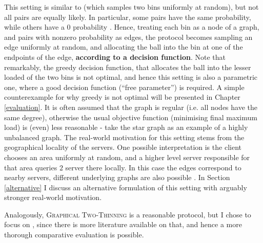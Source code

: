 This setting is similar to \TwoChoice (which samples two bins uniformly at random), but not all pairs are equally likely. In particular, some pairs have the same probability, while others have a $0$ probability . Hence, treating each bin as a node of a graph, and pairs with nonzero probability as edges, the protocol becomes sampling an edge uniformly at random, and allocating the ball into the bin at one of the endpoints of the edge, \textbf{according to a decision function}. Note that remarkably, the greedy decision function, that allocates the ball into the lesser loaded of the two bins is not optimal, and hence this setting is also a parametric one, where a good decision function (``free parameter'') is required. A simple counterexample for why greedy is not optimal will be presented in Chapter \ref{evaluation}. It is often assumed that the graph is regular (i.e. all nodes have the same degree), otherwise the usual objective function (minimising final maximum load) is (even) less reasonable - take the star graph as an example of a highly unbalanced graph. The real-world motivation for this setting stems from the geographical locality of the servers. One possible interpretation is the client chooses an area uniformly at random, and a higher level server responsible for that area queries $2$ server there locally. In this case the edges correspond to nearby servers, different underlying graphs are also possible \cite{peres2015oneplusbeta}. In Section \ref{alternative} I discuss an alternative formulation of this setting with arguably stronger real-world motivation.

Analogously, \textsc{Graphical Two-Thinning} is a reasonable protocol, but I chose to focus on \GraphicalTwoChoice, since there is more literature available on that, and hence a more thorough comparative evaluation is possible.\\


